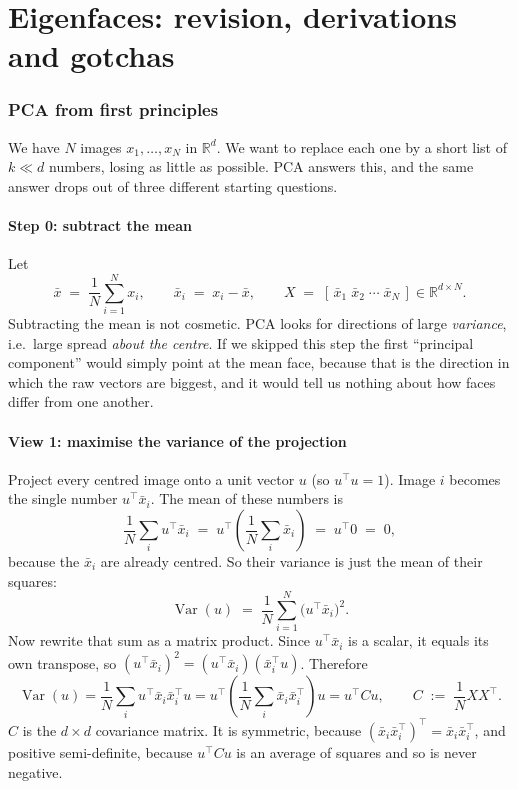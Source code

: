 \documentclass[11pt]{article}
\theoremstyle{definition}
\theoremstyle{remark}
\newcommand{\R}{\mathbb{R}}
\begin{document}
\part{Eigenfaces: revision, derivations and gotchas}

\section{PCA from first principles}

We have $N$ images $x_1,\dots,x_N$ in $\R^d$. We want to replace each one by a
short list of $k \ll d$ numbers, losing as little as possible. PCA answers this,
and the same answer drops out of three different starting questions.

\subsection{Step 0: subtract the mean}\label{sec:centre}

Let
\[
  \bar{x} \;=\; \frac{1}{N}\sum_{i=1}^{N} x_i ,
  \qquad
  \bar{x}_i \;=\; x_i - \bar{x} ,
  \qquad
  X \;=\; [\,\bar{x}_1 \; \bar{x}_2 \; \cdots \; \bar{x}_N\,] \in \R^{d\times N}.
\]
Subtracting the mean is not cosmetic. PCA looks for directions of large
\emph{variance}, i.e.\ large spread \emph{about the centre}. If we skipped this
step the first ``principal component'' would simply point at the mean face, because
that is the direction in which the raw vectors are biggest, and it would tell us
nothing about how faces differ from one another.

\subsection{View 1: maximise the variance of the projection}\label{sec:view1}

Project every centred image onto a unit vector $u$ (so $u^{\!\top} u = 1$). Image
$i$ becomes the single number $u^{\!\top} \bar{x}_i$. The mean of these numbers is
\[
  \frac{1}{N}\sum_i u^{\!\top} \bar{x}_i
  \;=\; u^{\!\top}\!\left(\frac{1}{N}\sum_i \bar{x}_i\right) \;=\; u^{\!\top} 0 \;=\; 0,
\]
because the $\bar{x}_i$ are already centred. So their variance is just the mean of their
squares:
\[
  \operatorname{Var}(u)
  \;=\; \frac{1}{N}\sum_{i=1}^{N}\bigl(u^{\!\top} \bar{x}_i\bigr)^2 .
\]
Now rewrite that sum as a matrix product. Since $u^{\!\top} \bar{x}_i$ is a scalar, it
equals its own transpose, so $(u^{\!\top} \bar{x}_i)^2 = (u^{\!\top} \bar{x}_i)(\bar{x}_i^{\!\top} u)$. Therefore
\[
  \operatorname{Var}(u)
  = \frac{1}{N}\sum_i u^{\!\top} \bar{x}_i \bar{x}_i^{\!\top} u
  = u^{\!\top}\!\left(\frac{1}{N}\sum_i \bar{x}_i \bar{x}_i^{\!\top}\right)\! u
  = u^{\!\top} C u,
  \qquad
  C \;:=\; \frac{1}{N} X X^{\!\top}.
\]
$C$ is the $d\times d$ covariance matrix. It is symmetric, because
$(\bar{x}_i\bar{x}_i^{\!\top})^{\!\top} = \bar{x}_i\bar{x}_i^{\!\top}$, and positive semi-definite, because
$u^{\!\top} C u$ is an average of squares and so is never negative.
\end{document}
